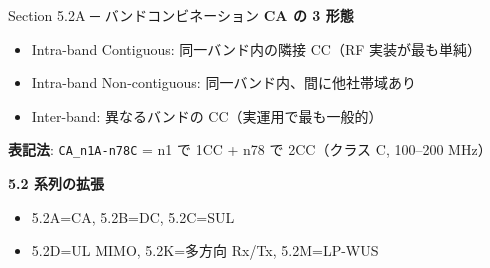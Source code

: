 \begin{frame}{Section 5.2A ─ バンドコンビネーション}
\textbf{CA の 3 形態}
\begin{itemize}
  \item Intra-band Contiguous: 同一バンド内の隣接 CC（RF 実装が最も単純）
  \item Intra-band Non-contiguous: 同一バンド内、間に他社帯域あり
  \item Inter-band: 異なるバンドの CC（実運用で最も一般的）
\end{itemize}

\textbf{表記法}: \texttt{CA\_n1A-n78C} = n1 で 1CC + n78 で 2CC（クラス C, 100--200 MHz）

\textbf{5.2 系列の拡張}
\begin{itemize}
  \item 5.2A=CA, 5.2B=DC, 5.2C=SUL
  \item 5.2D=UL MIMO, 5.2K=多方向 Rx/Tx, 5.2M=LP-WUS
\end{itemize}
\end{frame}
